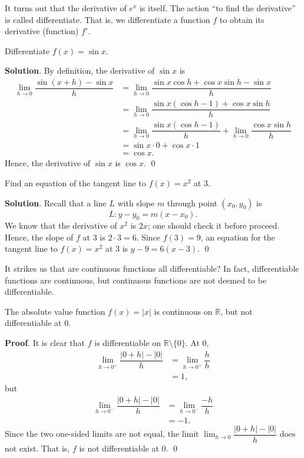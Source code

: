 \documentclass[11pt]{book}
\theoremstyle{break}
\theoremstyle{no_label}
\newcommand{\bbR}{\mathbb{R}}
\numberwithin{equation}{section}
\begin{document}
It turns out that the derivative of $e^x$ is itself. The action ``to find the derivative'' is called differentiate. That is, we differentiate a function $f$ to obtain its derivative (function) $f'$.

\begin{example}
    Differentiate $f(x)=\sin x$.
\end{example}
\textbf{Solution}. By definition, the derivative of $\sin x$ is \begin{align*}
    \lim_{h\to 0}\dfrac{\sin(x+h)-\sin x}{h}&=\lim_{h\to 0}\dfrac{\sin x\cos h+\cos x\sin h-\sin x}{h}\\
    &=\lim_{h\to 0}\dfrac{\sin x(\cos h-1)+\cos x\sin h}{h}\\
    &=\lim_{h\to 0}\dfrac{\sin x(\cos h-1)}{h}+\lim_{h\to 0}\dfrac{\cos x\sin h}{h}\\
    &=\sin x\cdot 0+\cos x\cdot 1\\
    &=\cos x.
\end{align*}
Hence, the derivative of $\sin x$ is $\cos x$. \qed

\begin{example}
    Find an equation of the tangent line to $f(x)=x^2$ at $3$.
\end{example}
\textbf{Solution}. Recall that a line $L$ with slope $m$ through point $(x_0, y_0)$ is $$L:y-y_0=m(x-x_0).$$ We know that the derivative of $x^2$ is $2x$; one should check it before proceed. Hence, the slope of $f$ at $3$ is $2\cdot 3=6$. Since $f(3)=9$, an equation for the tangent line to $f(x)=x^2$ at $3$ is $y-9=6(x-3)$. \qed

It strikes us that are continuous functions all differentiable? In fact, differentiable functions are continuous, but continuous functions are not deemed to be differentiable.

\begin{example}
    The absolute value function $f(x)=|x|$ is continuous on $\bbR$, but not differentiable at $0$.
\end{example}
\textbf{Proof}. It is clear that $f$ is differentiable on $\bbR\setminus\{0\}$. At $0$, \begin{align*}
    \lim_{h\to 0^+}\dfrac{|0+h|-|0|}{h}&=\lim_{h\to 0^+}\dfrac{h}{h}\\
    &=1,
\end{align*} but \begin{align*}
    \lim_{h\to 0^-}\dfrac{|0+h|-|0|}{h}&=\lim_{h\to 0^-}\dfrac{-h}{h}\\
    &=-1.
\end{align*} Since the two one-sided limits are not equal, the limit $\displaystyle\lim_{h\to 0}\dfrac{|0+h|-|0|}{h}$ does not exist. That is, $f$ is not differentiable at $0$. \qed
\end{document}
